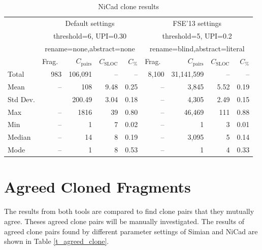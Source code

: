 \documentclass{IEEEtran}
\begin{document}
\begin{table}[h]
	\centering
	\caption{NiCad clone results}
	\label{t_nicad_raw_results}
		\begin{tabular}{l|r|r|r|r|r|r|r|r}
			\hline
			\multirow{4}{*}{} & \multicolumn{4}{c|}{Default settings} & \multicolumn{4}{c}{FSE'13 settings} \\ \cline{2-9} 
			& \multicolumn{4}{c|}{threshold=6, UPI=0.30} & \multicolumn{4}{c}{threshold=5, UPI=0.2} \\ %
			& \multicolumn{4}{c|}{rename=none,abstract=none} & \multicolumn{4}{c}{rename=blind,abstract=literal} \\ \cline{2-9} %
			& Frag.~ & $C_{\mathrm{pairs}}$ & $C_{\mathrm{SLOC}}$ & $C_{\mathrm{\%}}$ & Frag.~ & $C_{\mathrm{pairs}}$ & $C_{\mathrm{SLOC}}$ & $C_{\mathrm{\%}}$ \\ %
			\hline
			Total & 983 & 106,091 & -- & -- & 8,100 & 31,141,599 & -- & --    \\
			Mean & -- & 108 & 9.48 & 0.25 & -- & 3,845 & 5.52 & 0.19 \\
			Std Dev. & 	& 200.49 & 3.04	& 0.18 & -- & 4,305 & 2.49 & 0.15 \\
			Max & -- & 1816 & 39 & 0.80 & -- & 46,469 & 111 & 0.88 \\
			Min & -- & 1 & 7 & 0.02 & -- & 1 & 3	 & 0.01 \\
			Median & -- & 14 & 8 & 0.19 & -- & 3,095 & 5 & 0.14 \\
			Mode & -- & 1 & 8 & 0.53 & -- & 1 & 4 & 0.33 \\
			\hline
		\end{tabular} 
\end{table}

\section*{Agreed Cloned Fragments}
The results from both tools are compared to find clone pairs that they mutually agree.  Theses agreed clone pairs will be manually investigated. The results of agreed clone pairs found by different parameter settings of Simian and NiCad are shown in Table \ref{t_agreed_clone}.
\end{document}
